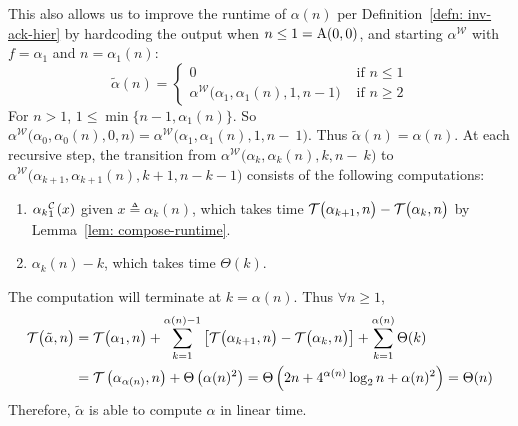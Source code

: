This also allows us to improve the runtime of $\alpha(n)$ per Definition~\ref{defn: inv-ack-hier} by hardcoding the output when $n\le 1 = \text{A}(0, 0)$, and starting $\alpha^{\mathcal{W}}$ with $f = \alpha_1$ and $n = \alpha_1(n)$:
\begin{equation*}
\tilde{\alpha}(n) = \begin{cases}
0 & \text{ if } n \le 1 \\ \alpha^{\mathcal{W}}\big(\alpha_1, \alpha_1(n), 1, n-1\big) & \text{ if } n \ge 2
\end{cases}
\end{equation*}
For $n > 1$, $1\le \min\big\{n-1, \alpha_1(n)\big\}$. So
$\alpha^{\mathcal{W}}\big(\alpha_0, \alpha_0(n), 0, n\big) =
\alpha^{\mathcal{W}}\big(\alpha_1, \alpha_1(n), 1, n-~1\big)$.
Thus $\tilde{\alpha}(n) = \alpha(n)$. At each recursive step, the transition from $\alpha^{\mathcal{W}}\big(\alpha_k, \alpha_k(n), k, n-~k\big)$ to $\alpha^{\mathcal{W}}\big(\alpha_{k+1}, \alpha_{k+1}(n), k+1, n-k-1\big)$ consists of the following computations:
 \begin{enumerate}[label={(\arabic*)}]
	\item $\cdt{\alpha_k}{1}(x)$ given $x\triangleq \alpha_k(n)$, which takes time $\mathcal{T}\big(\alpha_{k+1}, n\big) - \mathcal{T}\big(\alpha_k, n\big)$ by Lemma~\ref{lem: compose-runtime}.
	\item $\alpha_k(n) - k$, which takes time $\Theta(k)$.
\end{enumerate}
The computation will terminate at $k = \alpha(n)$. Thus $\forall n\ge 1$,
\begin{equation} \label{eq: inv-ack-runtime-improved}
\begin{aligned}
\mathcal{T}\big(\tilde{\alpha}, n\big) & = \mathcal{T}\big(\alpha_1, n\big) + \sum_{k=1}^{\alpha(n) - 1}
\left[ \mathcal{T}\big(\alpha_{k+1}, n\big) - \mathcal{T}\big(\alpha_k, n\big)
\right] + \sum_{k=1}^{\alpha(n)}\Theta(k) \\
& = \mathcal{T}\left(\alpha_{\alpha(n)}, n\right) + \Theta\left(\alpha(n)^2\right)
= \Theta\left(2n + 4^{\alpha(n)}\log_2n + \alpha(n)^2\right) = \Theta(n)
\end{aligned}
\end{equation}
Therefore, $\tilde{\alpha}$ is able to compute $\alpha$ in linear time.
